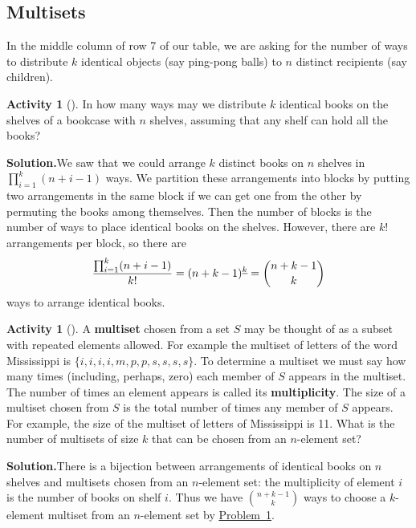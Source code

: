 \documentclass[10pt,]{book}
\newcommand{\terminology}[1]{\textbf{#1}}
\theoremstyle{plain}
\theoremstyle{definition}
\newtheorem{activity}[project]{Activity}
\numberwithin{equation}{chapter}
\begin{document}
\subsection[{Multisets}]{Multisets}\label{subsection-32}
In the middle column of row 7 of our table, we are asking for the number of ways to distribute \(k\) identical objects (say ping-pong balls) to \(n\) distinct recipients (say children).%
\begin{activity}[]\label{identicalbooks}
In how many ways may we distribute \(k\) identical books on the shelves of a bookcase with \(n\) shelves, assuming that any shelf can hold all the books?%
\par\medskip\noindent%
\textbf{Solution.}\quad We saw that we could arrange \(k\) distinct books on \(n\) shelves in \(\prod_{i=1}^k (n+i-1)\) ways. We partition these arrangements into blocks by putting two arrangements in the same block if we can get one from the other by permuting the books among themselves. Then the number of blocks is the number of ways to place identical books on the shelves. However, there are \(k!\) arrangements per block, so there are%
\begin{equation*}
{\prod_{i=1}^k (n+i-1)\over k!}=(n+k-1)^{\underline{k}}= \binom{n+k-1}{k}
\end{equation*}
ways to arrange identical books.%
\end{activity}
\begin{activity}[]\label{multiset}
A \terminology{multiset} chosen from a set \(S\) may be thought of as a subset with repeated elements allowed. For example the multiset of letters of the word Mississippi is \(\{i,i,i,i,m,p,p,s,s,s,s\}\). To determine a multiset we must say how many times (including, perhaps, zero) each member of \(S\) appears in the multiset. The number of times an element appears is called its \terminology{multiplicity}. The size of a multiset chosen from \(S\) is the total number of times any member of \(S\) appears. For example, the size of the multiset of letters of Mississippi is 11. What is the number of multisets of size \(k\) that can be chosen from an \(n\)-element set?%
\par\medskip\noindent%
\textbf{Solution.}\quad There is a bijection between arrangements of identical books on \(n\) shelves and multisets chosen from an \(n\)-element set: the multiplicity of element \(i\) is the number of books on shelf \(i\). Thus we have \(\binom{n+k-1}{k}\) ways to choose a \(k\)-element multiset from an \(n\)-element set by \hyperref[identicalbooks]{Problem~\ref{identicalbooks}}.%
\end{activity}
\end{document}
